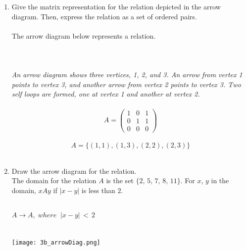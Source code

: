 \documentclass{amsart}
\theoremstyle{definition}
\theoremstyle{Exercise}
\theoremstyle{remark}
\theoremstyle{rule}
\numberwithin{equation}{section}
\begin{document}
\begin{enumerate}[label=(\alph*)]
\item  Give the matrix representation for the relation depicted in the arrow diagram. Then, express the relation as a set of ordered pairs.\\\\
The arrow diagram below represents a relation.\\\\
\\\\
{\color{blue}{\bf Figure 1:} \emph{An arrow diagram shows three vertices, 1, 2, and 3. An arrow from vertex 1 points to vertex 3, and another arrow from vertex 2 points to vertex 3. Two self loops are formed, one at vertex 1 and another at vertex 2. 
}
}
\\\\
\[ A=
\left( {\begin{array}{ccc}
  1&0&1\\
  0&1&1\\
  0&0&0
\end{array} }\right)
\]\\
$$A = \{(1,1), (1,3), (2,2),(2,3)\}$$\\
\item Draw the arrow diagram for the relation.\\
 The domain for the relation $A$ is the set $\{2,\, 5,\, 7,\, 8,\, 11\}$. For $x$, $y$ in the domain, $xAy$ if $|x-y|$ is less than $2$.
\\\\
\vspace*{0.5in}


$A \rightarrow A,\;where\;\; |x-y|\,<\,2$\\
\\\\
\texttt{[image: 3b\_arrowDiag.png]} \\\\
\end{enumerate}
 \newpage
\end{document}
